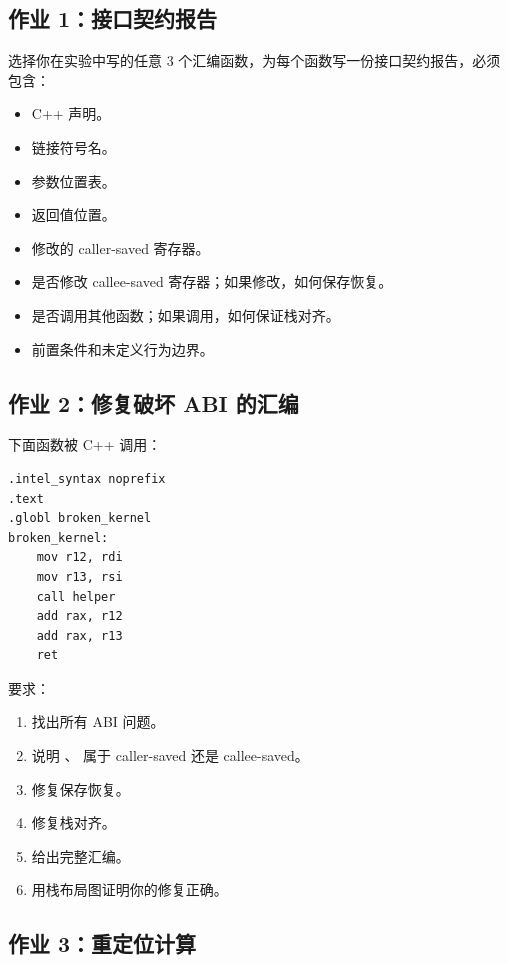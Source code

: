 \begin{exercisebox}
\subsection*{作业 1：接口契约报告}

选择你在实验中写的任意 3 个汇编函数，为每个函数写一份接口契约报告，必须包含：

\begin{itemize}
  \item C++ 声明。
  \item 链接符号名。
  \item 参数位置表。
  \item 返回值位置。
  \item 修改的 caller-saved 寄存器。
  \item 是否修改 callee-saved 寄存器；如果修改，如何保存恢复。
  \item 是否调用其他函数；如果调用，如何保证栈对齐。
  \item 前置条件和未定义行为边界。
\end{itemize}

\subsection*{作业 2：修复破坏 ABI 的汇编}

下面函数被 C++ 调用：

\begin{lstlisting}
.intel_syntax noprefix
.text
.globl broken_kernel
broken_kernel:
    mov r12, rdi
    mov r13, rsi
    call helper
    add rax, r12
    add rax, r13
    ret
\end{lstlisting}

要求：

\begin{enumerate}
  \item 找出所有 ABI 问题。
  \item 说明 、 属于 caller-saved 还是 callee-saved。
  \item 修复保存恢复。
  \item 修复栈对齐。
  \item 给出完整汇编。
  \item 用栈布局图证明你的修复正确。
\end{enumerate}

\subsection*{作业 3：重定位计算}


\end{exercisebox}
